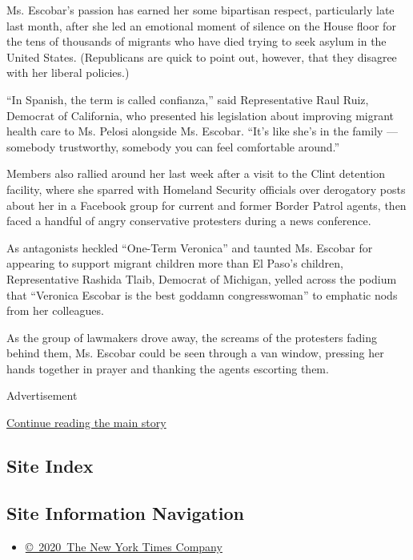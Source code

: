 Ms. Escobar's passion has earned her some bipartisan respect,
particularly late last month, after she led an emotional moment of
silence on the House floor for the tens of thousands of migrants who
have died trying to seek asylum in the United States. (Republicans are
quick to point out, however, that they disagree with her liberal
policies.)

``In Spanish, the term is called confianza,'' said Representative Raul
Ruiz, Democrat of California, who presented his legislation about
improving migrant health care to Ms. Pelosi alongside Ms. Escobar.
``It's like she's in the family --- somebody trustworthy, somebody you
can feel comfortable around.''

Members also rallied around her last week after a visit to the Clint
detention facility, where she sparred with Homeland Security officials
over derogatory posts about her in a Facebook group for current and
former Border Patrol agents, then faced a handful of angry conservative
protesters during a news conference.

As antagonists heckled ``One-Term Veronica'' and taunted Ms. Escobar for
appearing to support migrant children more than El Paso's children,
Representative Rashida Tlaib, Democrat of Michigan, yelled across the
podium that ``Veronica Escobar is the best goddamn congresswoman'' to
emphatic nods from her colleagues.

As the group of lawmakers drove away, the screams of the protesters
fading behind them, Ms. Escobar could be seen through a van window,
pressing her hands together in prayer and thanking the agents escorting
them.

Advertisement

\protect\hyperlink{after-bottom}{Continue reading the main story}

\hypertarget{site-index}{%
\subsection{Site Index}\label{site-index}}

\hypertarget{site-information-navigation}{%
\subsection{Site Information
Navigation}\label{site-information-navigation}}

\begin{itemize}
\tightlist
\item
  \href{https://help.nytimes3xbfgragh.onion/hc/en-us/articles/115014792127-Copyright-notice}{©~2020~The
  New York Times Company}
\end{itemize}

